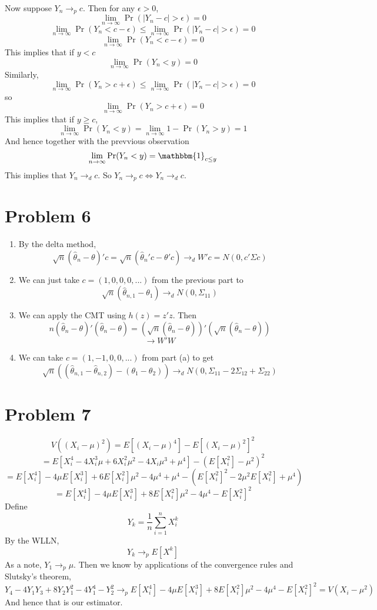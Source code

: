 \documentclass[10pt,letter]{article}
\begin{document}
Now suppose $Y_n \to_p c$. Then for any $\epsilon > 0$,
\[\lim_{n \to \infty} \Pr(|Y_n - c| > \epsilon) = 0 \]
\[ \lim_{n \to \infty} \Pr(Y_n < c - \epsilon) \le \lim_{n \to \infty} \Pr(|Y_n - c| > \epsilon) = 0 \]
\[ \lim_{n \to \infty} \Pr(Y_n < c - \epsilon) = 0 \]
This implies that if $y < c$
\[ \lim_{n \to \infty} \Pr(Y_n < y) = 0 \]
Similarly,
\[ \lim_{n \to \infty} \Pr(Y_n > c + \epsilon) \le \lim_{n \to \infty} \Pr(|Y_n - c| > \epsilon) = 0 \]
so
\[ \lim_{n \to \infty} \Pr(Y_n > c + \epsilon) = 0 \]
This implies that if $y \ge c$,
\[ \lim_{n \to \infty} \Pr(Y_n < y) = \lim_{n \to \infty} 1 - \Pr(Y_n > y) = 1 \]
And hence together with the prevvious observation
\[ \lim_{n \to \infty} \Pr(Y_n < y) = \mathbbm{1}_{c \le y} \]
This implies that $Y_n \to_d c$. So $Y_n \to_p c \iff Y_n \to_d c$.
\section*{Problem 6}
\begin{enumerate}[label=(\alph*)]
\item By the delta method,
\[ \sqrt{n} (\hat{\theta}_n - \theta)' c  = \sqrt{n} (\hat{\theta}_n'c - \theta'c) \to_d W'c = N(0,c'\Sigma c) \]
\item We can just take $c = (1, 0, 0, 0, ...)$ from the previous part to
\[ \sqrt{n} (\hat{\theta}_{n,1} - \theta_1) \to_d N(0, \Sigma_{11}) \]
\item We can apply the CMT using $h(z) = z'z$. Then
\[ n (\hat{\theta}_n- \theta)'(\hat{\theta}_n- \theta) = (\sqrt{n} (\hat{\theta}_n- \theta))'(\sqrt{n}(\hat{\theta}_n- \theta)) \]
\[ \to W'W \]
\item We can take $c = (1, -1, 0, 0, ...)$ from part (a) to get
\[ \sqrt{n} ((\hat{\theta}_{n,1} - \hat{\theta}_{n,2}) - (\theta_1 - \theta_2)) \to_d N(0, \Sigma_{11} - 2\Sigma_{12} + \Sigma_{22}) \]
\end{enumerate}
\section*{Problem 7}
\[ V((X_i - \mu)^2) = E[(X_i - \mu)^4] - E[(X_i - \mu)^2]^2 \]
\[  = E[X_i^4 - 4 X_i^3 \mu  + 6 X_i^2 \mu^2 - 4 X_i \mu^3 + \mu^4] - (E[X_i^2] - \mu^2)^2 \]
\[ = E[X_i^4] - 4\mu E[X_i^3] + 6E[X_i^2]\mu^2 - 4\mu^4 + \mu^4 - (E[X_i^2]^2 - 2\mu^2 E[X_i^2]+ \mu^4) \]
\[ = E[X_i^4] - 4\mu E[X_i^3] + 8E[X_i^2]\mu^2 - 4\mu^4 - E[X_i^2]^2  \]
Define
\[ Y_k = \frac{1}{n}\sum_{i=1}^n X_i^k \]
By the WLLN,
\[ Y_k \to_p E[X^k] \]
As a note, $Y_1 \to_p \mu$. Then we know by applications of the convergence rules and Slutsky's theorem,
\[ Y_4 - 4Y_1 Y_3 + 8Y_2 Y_1^2 - 4 Y_1^4 - Y_2^2 \to_p E[X_i^4] - 4\mu E[X_i^3] + 8E[X_i^2]\mu^2 - 4\mu^4 - E[X_i^2]^2 = V(X_i - \mu^2) \]
And hence that is our estimator.
\end{document}
